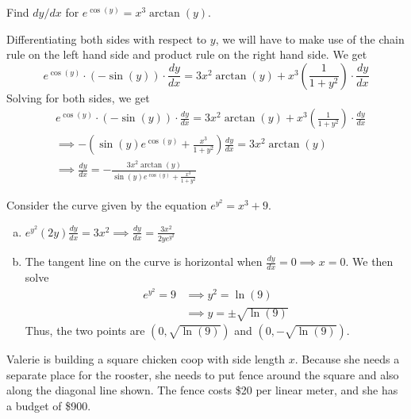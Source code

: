 \documentclass[11pt]{exam}
\newcommand{\dydx}{\frac{dy}{dx}}
\begin{document}
\begin{questions}
  \question Find $dy/dx$ for $e^{\cos(y)} = x^3\arctan(y)$.
    \begin{solution}
      Differentiating both sides with respect to \(y\), we will have
      to make use of the chain rule on the left hand side and product
      rule on the right hand side. We get \[
        e^{\cos(y)} \cdot (-\sin(y)) \cdot \dydx = 3x^2 \arctan(y) +
        x^3\left( \frac{1}{1+y^2} \right) \cdot \dydx
      \]
      Solving for both sides, we get
      \begin{align*}
        & e^{\cos(y)} \cdot (-\sin(y)) \cdot \dydx = 3x^2 \arctan(y) +
        x^3\left( \frac{1}{1+y^2} \right) \cdot \dydx\\
        & \implies -\left(\sin(y)e^{\cos(y)} + \frac{x^3}{1+y^2}
        \right) \dydx = 3x^2 \arctan(y) \\
        &\implies \dydx = -\frac{3x^2 \arctan(y)}{\sin(y)e^{\cos(y)} + \frac{x^3}{1+y^2}}
      \end{align*}
    \end{solution}
    \vspace{0.1in}
  \question Consider the curve given by the equation $e^{y^2}=x^3 + 9$.
    \begin{solution}
      \begin{enumerate}[(a)]
      \item \(e^{y^2} (2y) \dydx = 3x^2 \implies \dydx = \frac{3x^2}{2ye^{y^2}}\)
      \item The tangent line on the curve is horizontal when \(\dydx =
        0 \implies x = 0\). We then solve
        \begin{align*}
          e^{y^2} = 9 & \implies y^2 = \ln(9) \\
          & \implies y = \pm \sqrt{\ln(9)}
        \end{align*}
        Thus, the two points are \((0,\sqrt{\ln(9)})\) and \((0,-\sqrt{\ln(9)})\).
      \end{enumerate}
    \end{solution}
  \question Valerie is building a square chicken coop with side length $x$.  Because she needs a separate place for the rooster, she needs to put fence around the square and also along the diagonal line shown.  The fence costs \$20 per linear meter, and she has a budget of \$900.  


\end{questions}
\end{document}
